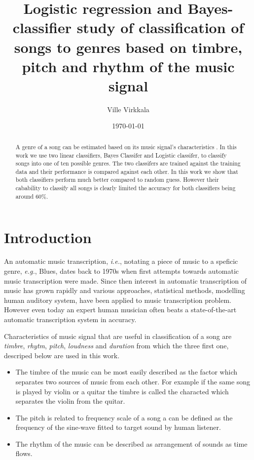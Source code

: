 \documentclass[aps,prb,10pt,twocolumn,groupedaddress]{revtex4-1}
\begin{document}
\title{Logistic regression and Bayes-classifier study of classification of
  songs to genres based on timbre, pitch and rhythm of the music signal }
\date{\today}
\author{Ville Virkkala}

\begin{abstract}
  A genre of a song can be estimated based on its music signal's
  characteristics . In this work we use two linear classifiers, Bayes Classifer
  and Logistic classifer, to classify songs into one of ten possible genres. The
  two classifers are trained against the training data and their performance is
  compared against each other. In this work we show that both classifiers
  perform much better compared to random guess. However their cabability to
  classify all songs is clearly limited the accuracy for both classifiers being
  around 60\%.
\end{abstract}

\maketitle

\section{Introduction}
An automatic music transcription, \textit{i.e.}, notating a piece of music to
a speficic genre, \textit{e.g.}, Blues, dates back to 1970s when first attempts
towards automatic music transcription were made\cite{musictranscription}. Since
then interest in
automatic transcription of music has grown rapidly and various approaches,
statistical methods, modelling human auditory system, have been applied to
music transcription problem. However even today an expert human musician often
beats a state-of-the-art automatic transcription system in accuracy.

Characteristics of music signal that are useful in classification of a song
are \textit{timbre}, \textit{rhytm}, \textit{pitch}, \textit{loudness} and
\textit{duration}\cite{musictranscription} from which the three first one,
descriped below are used in this work.
\begin{itemize}  
\item The timbre of the music can be most easily described as the factor
  which separates two sources of music from each other. For example if the same
  song is played by violin or a quitar the timbre is called the characted which
  separates the violin from the quitar.
\item The pitch is related to frequency scale of a song a can be defined as the
  frequency of the sine-wave fitted to target sound by human listener.
\item The rhythm of the music can be described as arrangement of sounds as time
  flows.
\end{itemize}
\end{document}
